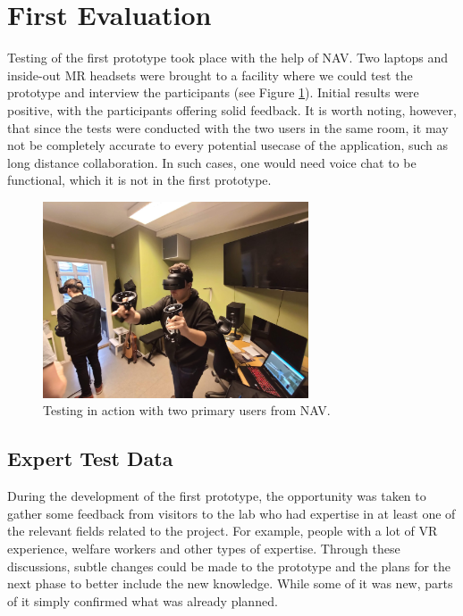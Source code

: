 \section{First Evaluation}
Testing of the first prototype took place with the help of NAV. Two laptops and inside-out MR headsets were brought to a facility where we could test the prototype and interview the participants (see Figure \ref{fig:testingPhase1}). Initial results were positive, with the participants offering solid feedback. It is worth noting, however, that since the tests were conducted with the two users in the same room, it may not be completely accurate to every potential usecase of the application, such as long distance collaboration. In such cases, one would need voice chat to be functional, which it is not in the first prototype.

\begin{figure}[H]
  \centering
    \includegraphics[width=0.7\textwidth]{fig/phase_1/testingPhase1.jpg}
 \caption{Testing in action with two primary users from NAV.}
\label{fig:testingPhase1}
\end{figure}


\subsection{Expert Test Data}
During the development of the first prototype, the opportunity was taken to gather some feedback from visitors to the lab who had expertise in at least one of the relevant fields related to the project. For example, people with a lot of VR experience, welfare workers and other types of expertise. Through these discussions, subtle changes could be made to the prototype and the plans for the next phase to better include the new knowledge. While some of it was new, parts of it simply confirmed what was already planned.

